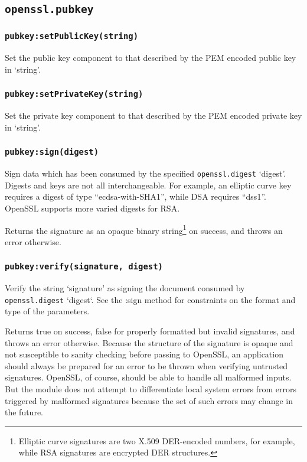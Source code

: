 \documentclass[11pt, oneside]{memoir}
\newcommand*{\fn}[1]{\texttt{#1}\xspace}
\newcommand*{\module}[1]{\texttt{#1}\xspace}
\newcounter{toccols}
\newenvironment{Module}[1]{
	\subsection{\texttt{#1}}
	\addtocontents{toc}{
		\protect\begin{multicols}{\value{toccols}}
	}
}{
	\addtocontents{toc}{\protect\end{multicols}}
}
\begin{document}
\begin{Module}{openssl.pubkey}
\subsubsection[\fn{pubkey:setPublicKey}]{\fn{pubkey:setPublicKey(string)}}

Set the public key component to that described by the PEM encoded public key in `string'.

\subsubsection[\fn{pubkey:setPrivateKey}]{\fn{pubkey:setPrivateKey(string)}}

Set the private key component to that described by the PEM encoded private key in `string'.

\subsubsection[\fn{pubkey:sign}]{\fn{pubkey:sign(digest)}}

Sign data which has been consumed by the specified \module{openssl.digest} `digest'. Digests and keys are not all interchangeable. For example, an elliptic curve key requires a digest of type ``ecdsa-with-SHA1'', while DSA requires ``dss1''. OpenSSL supports more varied digests for RSA.

Returns the signature as an opaque binary string\footnote{Elliptic curve signatures are two X.509 DER-encoded numbers, for example, while RSA signatures are encrypted DER structures.} on success, and throws an error otherwise.

\subsubsection[\fn{pubkey:verify}]{\fn{pubkey:verify(signature, digest)}}

Verify the string `signature' as signing the document consumed by \module{openssl.digest} `digest`. See the :sign method for constraints on the format and type of the parameters.

Returns true on success, false for properly formatted but invalid signatures, and throws an error otherwise. Because the structure of the signature is opaque and not susceptible to sanity checking before passing to OpenSSL, an application should always be prepared for an error to be thrown when verifying untrusted signatures. OpenSSL, of course, should be able to handle all malformed inputs. But the module does not attempt to differentiate local system errors from errors triggered by malformed signatures because the set of such errors may change in the future.


\end{Module}
\end{document}
